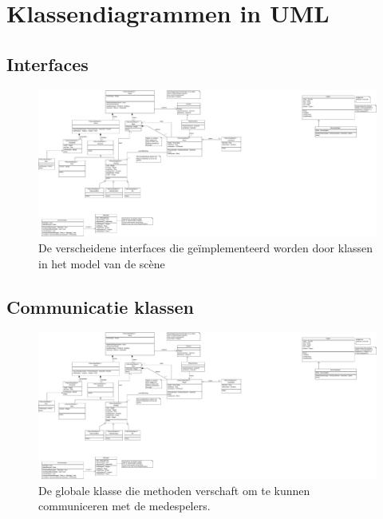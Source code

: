 \documentclass[a4paper,11pt]{article}
\begin{document}
    \newpage
    \appendix
    \section{Klassendiagrammen in UML}
    \subsection{Interfaces}
    \begin{figure}[h]
    \centering
    	\includegraphics{../Class-diagram/Interfaces.pdf}
    	\caption{De verscheidene interfaces die ge\"implementeerd worden door klassen in het model van de sc\`ene}
    \end{figure}
    \label{app:Interfaces}
    \FloatBarrier
    
    \subsection{Communicatie klassen}
    \begin{figure}[h]
        \centering
    	\includegraphics{../Class-diagram/NetCommunication.pdf}
	\caption{De globale klasse die methoden verschaft om te kunnen communiceren met de medespelers.}
    \end{figure}
    \label{app:Comm}
    \FloatBarrier
    \newpage
    
\end{document}
